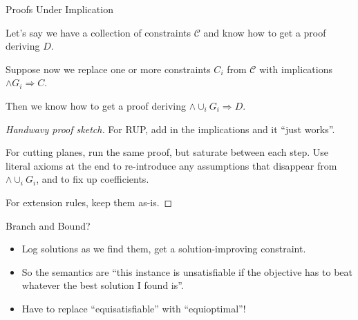 \documentclass[aspectratio=169,compress,10pt]{beamer}
\begin{document}
\begin{frame}{Proofs Under Implication}
    \begin{theorem}
    Let's say we have a collection of constraints $\mathcal{C}$ and know how to get a proof deriving
        $D$. \\\medskip

    Suppose now we replace one or more constraints $C_i$ from $\mathcal{C}$ with implications $\land
        G_i \Rightarrow C$. \\\medskip

    Then we know how to get a proof deriving $\land \cup_i G_i \Rightarrow D$.
    \end{theorem}

    \begin{proof}[Handwavy proof sketch]
        For RUP, add in the implications and it ``just works''. \\\medskip

        For cutting planes, run the same proof, but saturate between each step. Use literal
        axioms at the end to re-introduce any assumptions that disappear from $\land \cup_i G_i$,
        and to fix up coefficients. \\\medskip

        For extension rules, keep them as-is.
    \end{proof}
\end{frame}

\begin{frame}{Branch and Bound?}
    \begin{itemize}
        \item Log solutions as we find them, get a solution-improving constraint.
        \item So the semantics are ``this instance is unsatisfiable if the objective has to beat
            whatever the best solution I found is''.
            \pause
        \item Have to replace ``equisatisfiable'' with ``equioptimal''!
    \end{itemize}
\end{frame}
\end{document}
